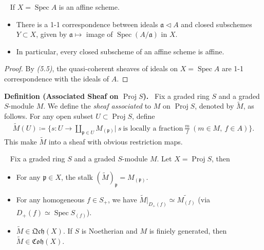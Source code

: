 \documentclass[11pt,a4paper,footinclude=true,headinclude=true]{scrbook} %
\DeclareMathOperator{\Spec}{Spec}
\DeclareMathOperator{\Proj}{Proj}
\newcommand{\pp}{\mathfrak{p}}
\newcommand{\<}{\langle}
\newcommand{\>}{\rangle}
\newcommand{\qcoh}{\mathfrak{Qch}}
\newcommand{\coh}{\mathfrak{Coh}}
\newenvironment{proposition}[2][]
{\renewcommand\theinnercustomprop{#2}\innercustomprop[#1] 
\begin{mdframed}[backgroundcolor=gray!20]\ }
{\end{mdframed}\endinnercustomprop}
\newenvironment{corollary}[2][]
{\renewcommand\theinnercustomcol{#2}\innercustomcol[#1]
\begin{mdframed}[backgroundcolor=gray!20]\ }
{\end{mdframed}\endinnercustomcol}
\newenvironment{definition}[2][Definition]
    { \begin{mdframed}[backgroundcolor=gray!20] \textbf{#1 #2.}\ }
    {  \end{mdframed}}
\begin{document}
\begin{corollary}{5.10}
    If $X=\Spec A$ is an affine scheme.
    \begin{itemize}
        \item[(i)] There is a 1-1 correspondence between ideals $\mathfrak{a}\triangleleft A$ and closed subschemes $Y\subset X$, given by  $\mathfrak{a}\mapsto$ image of $\Spec(A/\mathfrak{a})$ in $X$.
        \item[(ii)] In particular, every closed subscheme of an affine scheme is affine.
    \end{itemize}
\end{corollary}
\begin{proof}
    By \textit{(5.5)}, the quasi-coherent sheaves of ideals on $X=\Spec A$ are 1-1 correspondence with the ideals of $A$.
\end{proof}

\begin{definition}{(Associated Sheaf on $\Proj S$)}
    Fix a graded ring $S$ and a graded $S$-module $M$. We define the \textit{sheaf associated} to $M$ on $\Proj S$, denoted by $\widetilde{M}$, as follows. For any open subset $U\subset\Proj S$, define
    \begin{align*}
        \widetilde{M}(U)\coloneqq\Big\{s:U\to\coprod_{\pp\in U}M_{(\pp)}\Big|\ s\ \text{is locally a fraction}\ \frac{m}{f}\ (m\in M,\ f\in A)\Big\}.
    \end{align*}
    This make $\widetilde{M}$ into a sheaf with obvious restriction maps.
\end{definition}

\begin{proposition}{5.11}
    Fix a graded ring $S$ and a graded $S$-module $M$. Let $X=\Proj S$, then
    \begin{itemize}
        \item[(a)] For any $\pp\in X$, the stalk $(\widetilde{M})_\pp=M_{(\pp)}$.
        \item[(b)] For any homogeneous $f\in S_+$, we have $\widetilde{M}|_{D_+(f)}\simeq\widetilde{M_{(f)}}$ (via $D_+(f)\simeq\Spec S_{(f)}$).
        \item[(c)] $\widetilde{M}\in\qcoh(X)$. If $S$ is Noetherian and $M$ is finiely generated, then $\widetilde{M}\in\coh(X)$. 
    \end{itemize}
\end{proposition}
\end{document}
